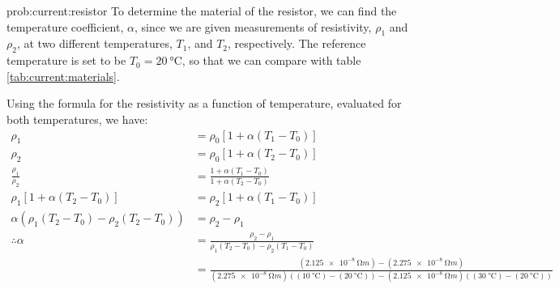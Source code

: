 \begin{solution}{prob:current:resistor}\label{soln:current:resistor}
To determine the material of the resistor, we can find the temperature coefficient, $\alpha$, since we are given measurements of resistivity, $\rho_1$ and $\rho_2$, at two different temperatures, $T_1$, and $T_2$, respectively. The reference temperature is set to be $T_0=\SI{20}{\degreeCelsius}$, so that we can compare with table \ref{tab:current:materials}.

Using the formula for the resistivity as a function of temperature, evaluated for both temperatures, we have:
\begin{align*}
\rho_1&=\rho_0[1+\alpha(T_1-T_0)]\\
\rho_2&=\rho_0[1+\alpha(T_2-T_0)]\\
\frac{\rho_1}{\rho_2}&=\frac{1+\alpha(T_1-T_0)}{1+\alpha(T_2-T_0)}\\
\rho_1 [1+\alpha(T_2-T_0)]&=\rho_2 [1+\alpha(T_1-T_0)]\\
\alpha \left( \rho_1(T_2-T_0) - \rho_2(T_2-T_0) \right)&=\rho_2-\rho_1\\
\therefore \alpha &= \frac{\rho_2-\rho_1}{\rho_1(T_2-T_0) - \rho_2(T_1-T_0) }\\
&=\frac{(\SI{2.125e-8}{\ohm m}) - (\SI{2.275e-8}{\ohm m})}{(\SI{2.275e-8}{\ohm m})((\SI{10}{\degreeCelsius})-(\SI{20}{\degreeCelsius})) - (\SI{2.125e-8}{\ohm m})((\SI{30}{\degreeCelsius})-(\SI{20}{\degreeCelsius})) }
\end{align*}


\end{solution}


